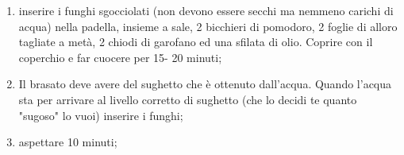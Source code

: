 \begin{enumerate}
    \item 
        inserire i funghi sgocciolati (non devono essere secchi ma nemmeno carichi di acqua) nella padella, insieme a sale, 2 bicchieri di pomodoro, 2 foglie di alloro tagliate a metà, 2 chiodi di garofano ed una sfilata di olio. Coprire con il coperchio e far cuocere per 15- 20 minuti;
    \item Il brasato deve avere del sughetto che è ottenuto dall'acqua. Quando l'acqua sta per arrivare al livello corretto di sughetto (che lo decidi te quanto "sugoso" lo vuoi) inserire i funghi;
    \item aspettare 10 minuti;
\end{enumerate}
